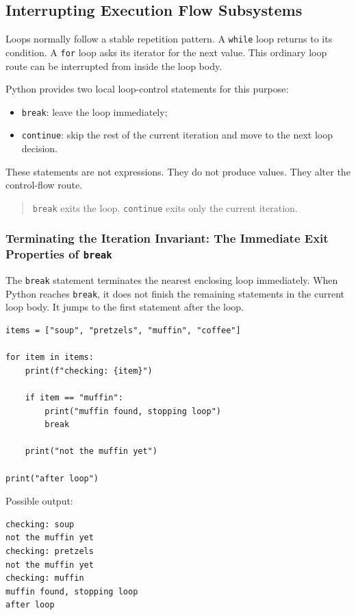 \subsection{Interrupting Execution Flow Subsystems}

Loops normally follow a stable repetition pattern. A \texttt{while} loop returns to its condition. A \texttt{for} loop asks its iterator for the next value. This ordinary loop route can be interrupted from inside the loop body.

Python provides two local loop-control statements for this purpose:

\begin{itemize}
    \item \texttt{break}: leave the loop immediately;
    \item \texttt{continue}: skip the rest of the current iteration and move to the next loop decision.
\end{itemize}

These statements are not expressions. They do not produce values. They alter the control-flow route.

\begin{quote}
\texttt{break} exits the loop. \texttt{continue} exits only the current iteration.
\end{quote}

\subsubsection{Terminating the Iteration Invariant: The Immediate Exit Properties of \texttt{break}}

The \texttt{break} statement terminates the nearest enclosing loop immediately. When Python reaches \texttt{break}, it does not finish the remaining statements in the current loop body. It jumps to the first statement after the loop.

\begin{verbatim}
items = ["soup", "pretzels", "muffin", "coffee"]

for item in items:
    print(f"checking: {item}")

    if item == "muffin":
        print("muffin found, stopping loop")
        break

    print("not the muffin yet")

print("after loop")
\end{verbatim}

Possible output:

\begin{verbatim}
checking: soup
not the muffin yet
checking: pretzels
not the muffin yet
checking: muffin
muffin found, stopping loop
after loop
\end{verbatim}

